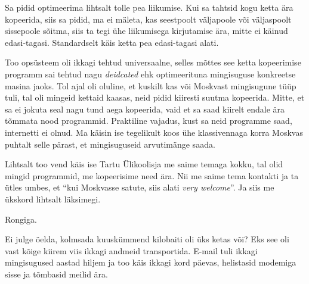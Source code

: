 
Sa pidid  optimeerima lihtsalt tolle pea liikumise. Kui sa tahtsid kogu ketta 
ära kopeerida, siis sa pidid, ma ei mäleta, kas seestpoolt väljapoole või 
väljaspoolt sissepoole sõitma, siis ta  tegi ühe liikumisega kirjutamise ära, 
mitte ei käinud edasi-tagasi. Standardselt käis ketta pea edasi-tagasi 
alati.


Too opsüsteem oli ikkagi  tehtud universaalne, selles mõttes see ketta 
kopeerimise programm sai tehtud nagu \emph{deidcated} ehk optimeerituna 
mingisuguse konkreetse masina jaoks. Tol ajal oli oluline, et  kuskilt kas või 
Moskvast mingisugune tüüp tuli, tal oli mingeid kettaid kaasas, neid pidid 
kiiresti suutma kopeerida. Mitte, et sa ei jokuta seal nagu tund aega 
kopeerida, vaid et sa saad  kiirelt endale ära tõmmata nood programmid. 
Praktiline vajadus, kust sa neid programme saad, internetti ei olnud. Ma käisin 
ise tegelikult koos ühe klassivennaga korra Moskvas puhtalt selle pärast, et 
mingisuguseid arvutimänge saada.


Lihtsalt too vend käis ise Tartu Ülikoolisja me saime temaga kokku, tal olid 
mingid programmid, me kopeerisime need ära. Nii me saime tema kontakti ja ta 
ütles umbes, et \enquote{kui Moskvasse satute, siis alati \emph{very welcome}}. 
Ja siis me ükskord lihtsalt läksimegi.


Rongiga. 


Ei julge öelda, kolmsada kuuskümmend kilobaiti oli üks ketas või? Eks see oli 
vast kõige kiirem viis ikkagi andmeid transportida. E-mail tuli ikkagi 
mingisugused aastad hiljem ja too käis ikkagi kord päevas, helistasid modemiga 
sisse ja tõmbasid meilid ära.

